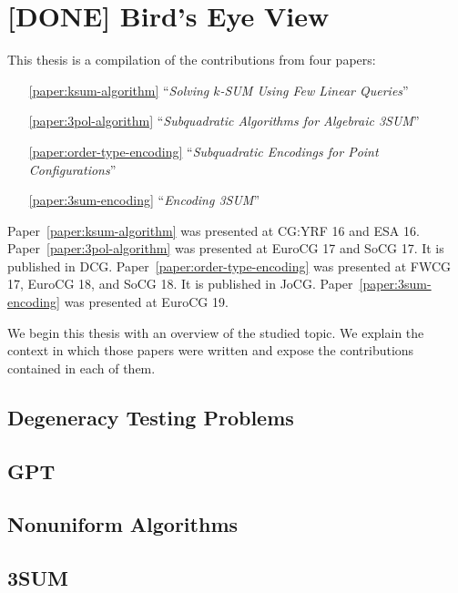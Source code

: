 \chapter{[DONE] Bird's Eye View}



This thesis is a compilation of the contributions from four papers:
%
\begin{enumerate}
	\item[\ref{paper:ksum-algorithm}] ``\emph{Solving \(k\)-SUM Using Few Linear Queries}''~\cite{CIO16}
	\item[\ref{paper:3pol-algorithm}] ``\emph{Subquadratic Algorithms for Algebraic 3SUM}''~\cite{BCILOS19}
	\item[\ref{paper:order-type-encoding}] ``\emph{Subquadratic Encodings for Point Configurations}''~\cite{CCILO19}
	\item[\ref{paper:3sum-encoding}] ``\emph{Encoding 3SUM}''~\cite{CCILMO19}
\end{enumerate}
%
Paper~\ref{paper:ksum-algorithm} was presented at CG:YRF 16 and ESA 16.
%
Paper~\ref{paper:3pol-algorithm} was presented at EuroCG 17 and SoCG 17. It is published in DCG.
%
Paper~\ref{paper:order-type-encoding} was presented at FWCG 17, EuroCG 18, and SoCG 18. It is published in JoCG.
%
Paper~\ref{paper:3sum-encoding} was presented at EuroCG 19.

We begin this thesis with an overview of the studied topic.
%
We explain the context in which those papers were written and expose
the contributions contained in each of them.

\section*{Degeneracy Testing Problems}


\section*{GPT}


\section*{Nonuniform Algorithms}


\section*{3SUM}



